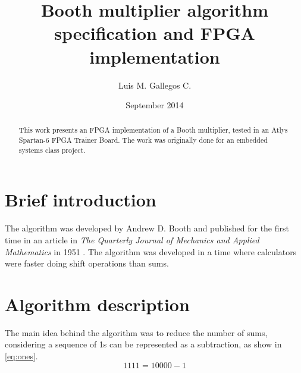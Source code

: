 \documentclass[titlepage]{article}
\begin{document}
\title{Booth multiplier algorithm specification and FPGA implementation}
\author{Luis M. Gallegos C.}
\date{September 2014}
\maketitle

\begin{abstract}
    This work presents an FPGA implementation of a Booth multiplier, tested in an Atlys Spartan-6 FPGA Trainer Board.
    The work was originally done for an embedded systems class project.
\end{abstract}

\section{Brief introduction} %
\label{sec:brief_introduction}

The algorithm was developed by Andrew D. Booth and published for the first time in an article in \emph{The Quarterly Journal of Mechanics and Applied Mathematics} in 1951 \cite{Booth1951Signed}.
The algorithm was developed in a time where calculators were faster doing shift operations than sums.\par




\section{Algorithm description} %
\label{sec:algorithm_description}

The main idea behind the algorithm was to reduce the number of sums, considering a sequence of 1s can be represented as a subtraction, as show in \eqref{eq:ones}.
\begin{equation}
    \label{eq:ones}
    1111 = 10000 - 1
\end{equation}\par
\end{document}
